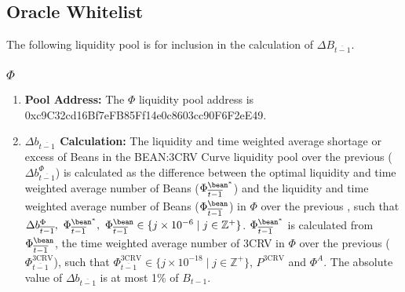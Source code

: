 \documentclass[class=article, crop=false]{standalone}
\begin{document}
\subsection{Oracle Whitelist}
The following liquidity pool is  for inclusion in the calculation of $\Delta B_{\overline{t-1}}$.
\subsubsection{$\Phi$}
    \begin{enumerate}
        \item \textbf{Pool Address:} The $\Phi$ liquidity pool address is 0xc9C32cd16Bf7eFB85Ff14e0c8603cc90F6F2eE49.
        \item \textbf{$\Delta b_{\overline{t-1}}$ Calculation:} The liquidity and time weighted average shortage or excess of Beans in the BEAN:3CRV Curve liquidity pool over the previous  ($\Delta b_{\overline{t-1}}^{\Phi}$) is calculated as the difference between the optimal liquidity and time weighted average number of Beans ($\Phi_{\overline{t-1}}^{{\bean}^*}$) and the liquidity and time weighted average number of Beans ($\Phi_{\overline{t-1}}^{\bean}$) in $\Phi$ over the previous , such that $\Delta b_{\overline{t-1}}^{\Phi},\ \Phi_{\overline{t-1}}^{{\bean}^*},\ \Phi_{\overline{t-1}}^{\bean} \in \{j \times 10^{-6} \mid j \in \mathbb{Z}^{+} \}$. $\Phi_{\overline{t-1}}^{{\bean}^*}$ is calculated from $\Phi_{\overline{t-1}}^{\bean}$, the time weighted average number of 3CRV in $\Phi$ over the previous  ($\Phi_{\overline{t-1}}^{\text{3CRV}}$), such that $\Phi_{\overline{t-1}}^{\text{3CRV}}\in \{j \times 10^{-18} \mid j \in \mathbb{Z}^{+} \}$, $P^{\text{3CRV}}$ and $\Phi^{A}$. The absolute value of $\Delta b_{\overline{t-1}}$ is at most 1\% of $B_{t-1}$.


\end{enumerate}
\end{document}
